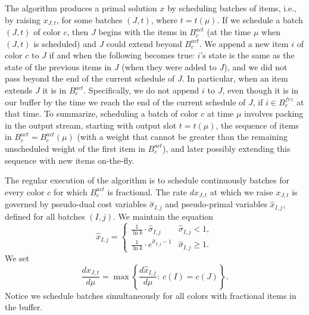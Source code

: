 \documentclass[12pt]{article}
\begin{document}
The algorithm produces a primal solution $x$ by scheduling
batches of items, i.e., by raising $x_{J,t}$, for some batches
$(J,t)$, where $t = t(\mu)$. If we schedule a batch $(J,t)$ of 
color $c$, then $J$
begins with the items in $B_c^{act}$ (at the time $\mu$ when
$(J,t)$ is scheduled) and $J$ could extend beyond
$B_c^{act}$. We append a new item $i$ of color $c$ to $J$ if
and when the following becomes true: $i$'s state is the same as 
the state of the previous 
items in $J$ (when they were added to $J$), and we did not
pass beyond the end of the current schedule of $J$. 
In particular, when an item extends $J$ it 
is in $B_c^{act}$. Specifically, we do not append $i$
to $J$, even though it is in our buffer by the time we reach
the end of the current schedule of $J$, if $i\in B_c^{frz}$
at that time.
To summarize, scheduling a batch of color $c$ at time $\mu$
involves packing in the output stream, starting with output slot 
$t = t(\mu)$, 
the sequence of items in $B_c^{act} = B_c^{act}(\mu)$ (with a weight
that cannot be greater than the remaining unscheduled weight of the 
first item in $B_c^{act}$), and later possibly extending this sequence 
with new items on-the-fly.

The regular execution of the algorithm is to schedule
continuously batches for every color $c$ for which $B_c^{act}$
is fractional. The rate $dx_{J,t}$ at which we raise $x_{J,t}$ is
governed by pseudo-dual cost variables $\hat{\sigma}_{I,j}$
and pseudo-primal variables $\hat{x}_{I,j}$, defined for all
batches $(I,j)$. We maintain the equation
$$
\hat{x}_{I,j} = \left\{\begin{array}{ll}
                              \frac{1}{\ln k}\cdot\hat{\sigma}_{I,j} & \hat{\sigma}_{I,j} < 1, \\
                              \frac{1}{\ln k}\cdot e^{\hat{\sigma}_{I,j} - 1} & \hat{\sigma}_{I,j}\ge 1.
                              \end{array}\right.
$$
We set
$$
\frac{dx_{J,t}}{d\mu} = \max\left\{\frac{d\hat{x}_{I,j}}{d\mu}:\ c(I) = c(J)\right\}.
$$
Notice we schedule batches simultaneously for all colors with
fractional items in the buffer.
\end{document}
